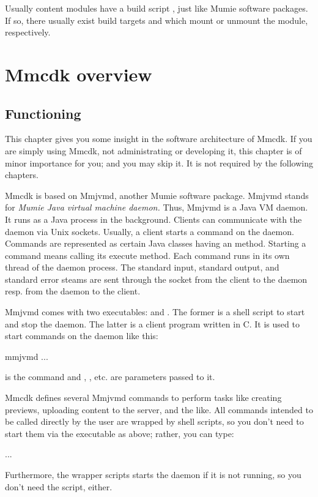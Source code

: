 \documentclass{generic}
\begin{document}
Usually content modules have a build script , just like Mumie software
packages. If so, there usually exist build targets  and
 which mount or unmount the module, respectively.


\section{Mmcdk overview}

\subsection{Functioning}

This chapter gives you some insight in the software architecture of Mmcdk.
If you are simply using Mmcdk, not administrating or developing it, this
chapter is of minor importance for you; and you may skip it. It is not required
by the following chapters.

Mmcdk is based on Mmjvmd, another Mumie software package. Mmjvmd stands for
\emph{Mumie Java virtual machine daemon.} Thus, Mmjvmd is a Java VM daemon. It
runs as a Java process in the background. Clients can communicate with the
daemon via Unix sockets. Usually, a client starts a command on the daemon.
Commands are represented as certain Java classes having an 
method. Starting a command means calling its execute method. Each command runs
in its own thread of the daemon process.  The standard input, standard output,
and standard error steams are sent through the socket from the client to the
daemon resp. from the daemon to the client.

Mmjvmd comes with two executables:  and . The former
is a shell script to start and stop the daemon. The latter is a client program
written in C. It is used to start commands on the daemon like this:
\begin{preformatted}%
  mmjvmd    ...
\end{preformatted}
 is the command and , ,
etc. are parameters passed to it.

Mmcdk defines several Mmjvmd commands to perform tasks like creating previews,
uploading content to the server, and the like. All commands intended to be
called directly by the user are wrapped by shell scripts, so you don't need to
start them via the  executable as above; rather, you can type:
\begin{preformatted}%
     ...
\end{preformatted}
Furthermore, the wrapper scripts starts the daemon if it is not running, so you
don't need the  script, either.
\end{document}
